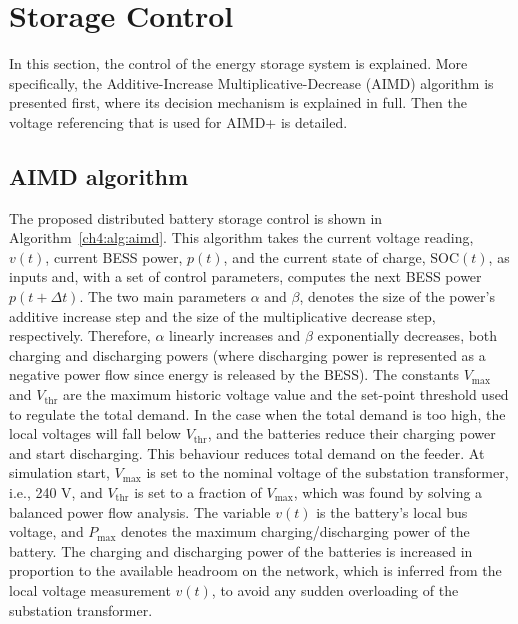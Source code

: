 \section{Storage Control}
\label{ch4:sec:storage-control}

In this section, the control of the energy storage system is explained.
More specifically, the Additive-Increase Multiplicative-Decrease (AIMD) algorithm is presented first, where its decision mechanism is explained in full.
Then the voltage referencing that is used for AIMD+ is detailed.

\subsection{AIMD algorithm}



The proposed distributed battery storage control is shown in Algorithm~\ref{ch4:alg:aimd}.
This algorithm takes the current voltage reading, $v(t)$, current BESS power, $p(t)$, and the current state of charge, $\text{SOC}(t)$, as inputs and, with a set of control parameters, computes the next BESS power $p(t + \Delta t)$.
The two main parameters $\alpha$ and $\beta$, denotes the size of the power's additive increase step and the size of the multiplicative decrease step, respectively.
Therefore, $\alpha$ linearly increases and $\beta$ exponentially decreases, both charging and discharging powers (where discharging power is represented as a negative power flow since energy is released by the BESS).
The constants $V_\text{max}$ and $V_\text{thr}$ are the maximum historic voltage value and the set-point threshold used to regulate the total demand.
In the case when the total demand is too high, the local voltages will fall below $V_\text{thr}$, and the batteries reduce their charging power and start discharging.
This behaviour reduces total demand on the feeder.
At simulation start, $V_\text{max}$ is set to the nominal voltage of the substation transformer, i.e., 240 V, and $V_\text{thr}$ is set to a fraction of $V_\text{max}$, which was found by solving a balanced power flow analysis.
The variable $v(t)$ is the battery's local bus voltage, and $P_\text{max}$ denotes the maximum charging/discharging power of the battery.
The charging and discharging power of the batteries is increased in proportion to the available headroom on the network, which is inferred from the local voltage measurement $v(t)$, to avoid any sudden overloading of the substation transformer.

